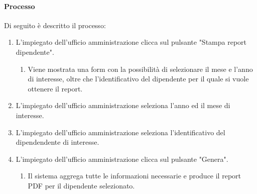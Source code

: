\paragraph{Processo}
Di seguito è descritto il processo:
\begin{enumerate}
	\item L'impiegato dell'ufficio amministrazione clicca sul pulsante "Stampa report dipendente".
		\begin{enumerate}
			\item Viene mostrata una form con la possibilità di selezionare il mese e l'anno di interesse, oltre che l'identificativo del dipendente per il quale si vuole ottenere il report.
		\end{enumerate}
	\item L'impiegato dell'ufficio amministrazione seleziona l'anno ed il mese di interesse.
	\item L'impiegato dell'ufficio amministrazione seleziona l'identificativo del dipendendente di interesse.
	\item L'impiegato dell'ufficio amministrazione clicca sul pulsante "Genera".
		\begin{enumerate}
			\item Il sistema aggrega tutte le informazioni necessarie e produce il report PDF per il dipendente selezionato.
		\end{enumerate}
\end{enumerate}
